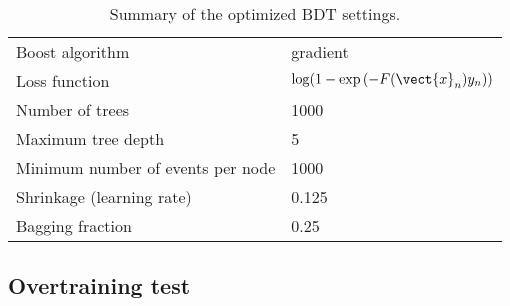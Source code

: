 \begin{table}
\begin{center}
\begin{tabular}{| l | l |}
    \hline
    Boost algorithm & gradient \\
    Loss function & \begin{math}\log
      (1-\exp{(-F(\vect{x}_n)y_n)})\end{math} \\
    Number of trees & 1000 \\
    Maximum tree depth & 5 \\
    Minimum number of events per node & 1000 \\
    Shrinkage (learning rate) & 0.125 \\
    Bagging fraction & 0.25 \\
    \hline
\end{tabular}
\caption[BDT setting summary.]{Summary of the optimized BDT settings.}
\label{chap:bdt:tab:bdt_settings}
\end{center}
\end{table}

\subsection{Overtraining test}
